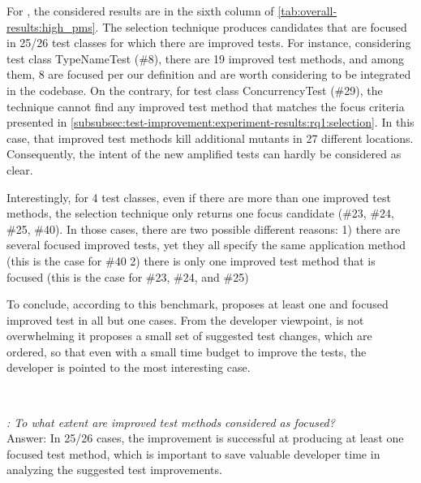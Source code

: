 For \rqcandidates{}, the considered results are in the sixth column of \autoref{tab:overall-results:high_pms}.
The selection technique produces candidates that are focused in 25/26 test classes for which there are improved tests.
For instance, considering test class TypeNameTest (\#8), there are 19 improved test methods, and among them, 8 are focused per our definition and are worth considering to be integrated in the codebase.
On the contrary, for test class ConcurrencyTest (\#29), the technique cannot find any improved test method that matches the focus criteria presented in \autoref{subsubsec:test-improvement:experiment-results:rq1:selection}. In this case, that improved test methods kill additional mutants in 27 different locations. 
Consequently, the intent of the new amplified tests can  hardly be considered as clear.

Interestingly, for 4 test classes, even if there are more than one improved test methods, the selection technique only  returns one focus candidate (\#23, \#24, \#25, \#40). 
In those cases, there are two possible different reasons:
1) there are several focused improved tests, yet they all specify the same application method (this is the case for \#40
2) there is only one improved test method that is focused (this is the case for \#23, \#24, and \#25)

To conclude, according to this benchmark, \dspot{} proposes at least one and focused improved test in all but one cases. From the developer viewpoint, \dspot is not overwhelming it proposes a small set of suggested test changes, which are ordered, so that even with a small time budget to improve the tests, the developer is pointed to the most interesting case.

~\\
\begin{mdframed}
	\textit{\rqcandidates{}:  To what extent are improved test methods considered as focused?}\\
	Answer: In 25/26 cases, the improvement is successful at producing at least one focused test method, which is important to save valuable developer time in analyzing the suggested test improvements.
\end{mdframed}
~\\



